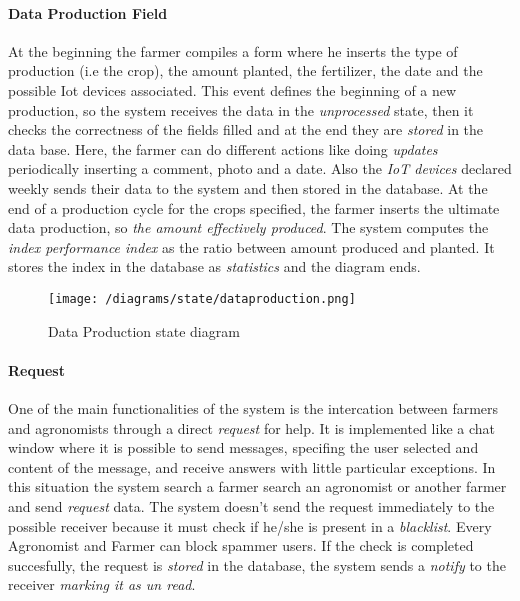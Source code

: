 		\paragraph{Data Production Field}
			At the beginning the farmer compiles a form where he inserts the type of production (i.e the crop), the amount planted, the fertilizer, the date and the possible Iot devices associated. This event defines the beginning of a new production, so the system receives the data in the \textit{unprocessed} state, then it checks the correctness of the fields filled and at the end they are \textit{stored} in the data base. Here, the farmer can do different actions like doing \textit{updates} periodically inserting a comment, photo and a date. Also the \textit{IoT devices} declared weekly sends their data to the system and then stored in the database. At the end of a production cycle for the crops specified, the farmer inserts the ultimate data production, so \textit{the amount effectively produced}. The system computes the \textit{index performance index} as the ratio between amount produced and planted. It stores the index in the database as \textit{statistics} and the diagram ends.
			
			\vspace{0.3cm}
			\begin{figure}[h]
				\centering
				\texttt{[image: /diagrams/state/dataproduction.png]}
				\caption{\label{fig:dataproductionState}Data Production state diagram}
			\end{figure}
		
		\paragraph{Request}
			One of the main functionalities of the system is the intercation between farmers and agronomists through a direct \textit{request} for help. It is implemented like a chat window where it is possible to send messages, specifing the user selected and content of the message, and receive answers with little particular exceptions. In this situation the system search a farmer search an agronomist or another farmer and send \textit{request} data. The system doesn't send the request immediately to the possible receiver because it must check if he/she is present in a \textit{blacklist}. Every Agronomist and Farmer can block spammer users.
			If the check is completed succesfully, the request is \textit{stored} in the database, the system sends a \textit{notify} to the receiver \textit{marking it as un read}. 
			
